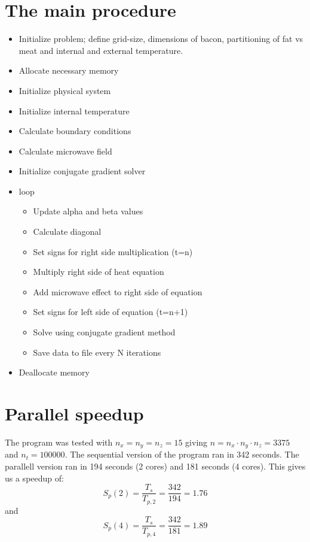 \section{The main procedure}

\begin{itemize}
  \item Initialize problem; define grid-size, dimensions of bacon, partitioning of fat vs meat
  and internal and external temperature.
  \item Allocate necessary memory
  \item Initialize physical system
  \item Initialize internal temperature
  \item Calculate boundary conditions
  \item Calculate microwave field
  \item Initialize conjugate gradient solver
  \item loop
  \begin{itemize}
    \item Update alpha and beta values
    \item Calculate diagonal
    \item Set signs for right side multiplication (t=n)
    \item Multiply right side of heat equation
    \item Add microwave effect to right side of equation
    \item Set signs for left side of equation (t=n+1)
    \item Solve using conjugate gradient method
    \item Save data to file every N iterations
  \end{itemize}
\item Deallocate memory
\end{itemize}

\section{Parallel speedup}

The program was tested with $n_x=n_y=n_z=15$ giving $n=n_x\cdot n_y\cdot n_z=3375$ and $n_t=100000$.
The sequential version of the program ran in 342 seconds. 
The parallell version ran in 194 seconds (2 cores) and 181 seconds (4 cores).
This gives us a speedup of:
\begin{equation}
S_p(2) = \frac{T_s}{T_{p,2}} = \frac{342}{194} = 1.76
\end{equation}
and 
\begin{equation}
S_p(4) = \frac{T_s}{T_{p,4}} = \frac{342}{181} = 1.89
\end{equation}

